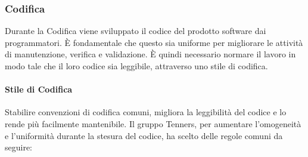 \subsubsection{Codifica}
Durante la Codifica viene sviluppato il codice del prodotto software dai programmatori. È fondamentale che questo sia uniforme per migliorare le attività di manutenzione, verifica e validazione. È quindi necessario normare il lavoro in modo tale che il loro codice sia leggibile, attraverso uno stile di codifica.
\paragraph{Stile di Codifica}
Stabilire convenzioni di codifica comuni, migliora la leggibilità del codice e lo rende più facilmente mantenibile. Il gruppo Tenners, per aumentare l'omogeneità e l'uniformità durante la stesura del codice, ha scelto delle regole comuni da seguire:
